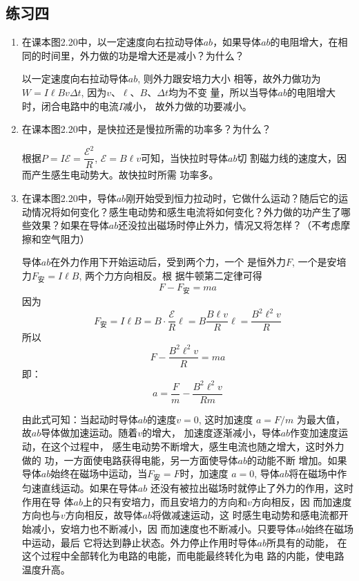 \subsection{练习四}
\begin{enumerate}
    \item 在课本图2.20中，以一定速度向右拉动导体$ab$，如果导体$ab$的电阻增大，在相同的时间里，外力做的功是增大还是减小？为什么？

    \begin{solution}
        以一定速度向右拉动导体$ab$, 则外力跟安培力大小
        相等，故外力做功为$W=I\ell Bv\Delta t$, 因为$v$、$\ell$、$B$、$\Delta t$均为不变
        量，所以当导体$ab$的电阻增大时，闭合电路中的电流$I$减小，
        故外力做的功要减小。
    \end{solution}
    
    \item 在课本图2.20中，是快拉还是慢拉所需的功率多？为什么？

    \begin{solution}
        根据$P=I\mathcal{E}=\dfrac{\mathcal{E}^2}{R}$,       $\mathcal{E}=B\ell v$可知，当快拉时导体$ab$切
        割磁力线的速度大，因而产生感生电动势大。故快拉时所需
        功率多。
    \end{solution}
    
    \item 在课本图2.20中，导体$ab$刚开始受到恒力拉动时，它做什么运动？随后它的运动情况将如何变化？感生电动势和感生电流将如何变化？外力做的功产生了哪些效果？如果在导体$ab$还没拉出磁场时停止外力，情况又将怎样？（不考虑摩擦和空气阻力）

    \begin{solution}
        导体$ab$在外力作用下开始运动后，受到两个力，一个
        是恒外力$F$, 一个是安培力$F_{\text{安}}=I\ell B$, 两个力方向相反。根
        据牛顿第二定律可得
\[F-F_{\text{安}}=ma\]
因为
\[F_{\text{安}}=I\ell B=B\cdot \dfrac{\mathcal{E}}{R}\ell =B\frac{B\ell v}{R}\ell =\frac{B^2\ell^2 v}{R}\]
所以
\[F-\frac{B^2\ell^2 v}{R}=ma\]
即：
\[a=\frac{F}{m}-\frac{B^2\ell^2 v}{Rm}\]

由此式可知：当起动时导体$ab$的速度$v=0$, 这时加速度
$a=F/m$
为最大值，故$ab$导体做加速运动。随着$v$的增大，
加速度逐渐减小，导体$ab$作变加速度运动，在这个过程中，
感生电动势不断增大，感生电流也随之增大，这时外力做的
功，一方面使电路获得电能，另一方面使导体$ab$的动能不断
增加。如果导体$ab$始终在磁场中运动，当$F_{\text{安}}=F$时，加速度
$a=0$, 导体$ab$将在磁场中作匀速直线运动。如果在导体$ab$
还没有被拉出磁场时就停止了外力的作用，这时作用在导
体$ab$上的只有安培力，而且安培力的方向和$v$方向相反，因
而加速度方向也与$v$方向相反，故导体$ab$将做减速运动，这
时感生电动势和感电流都开始减小，安培力也不断减小，因
而加速度也不断减小。只要导体$ab$始终在磁场中运动，最后
它将达到静止状态。外力停止作用时导体$ab$所具有的动能，
在这个过程中全部转化为电路的电能，而电能最终转化为电
路的内能，使电路温度升高。
    \end{solution}
    
\end{enumerate}



